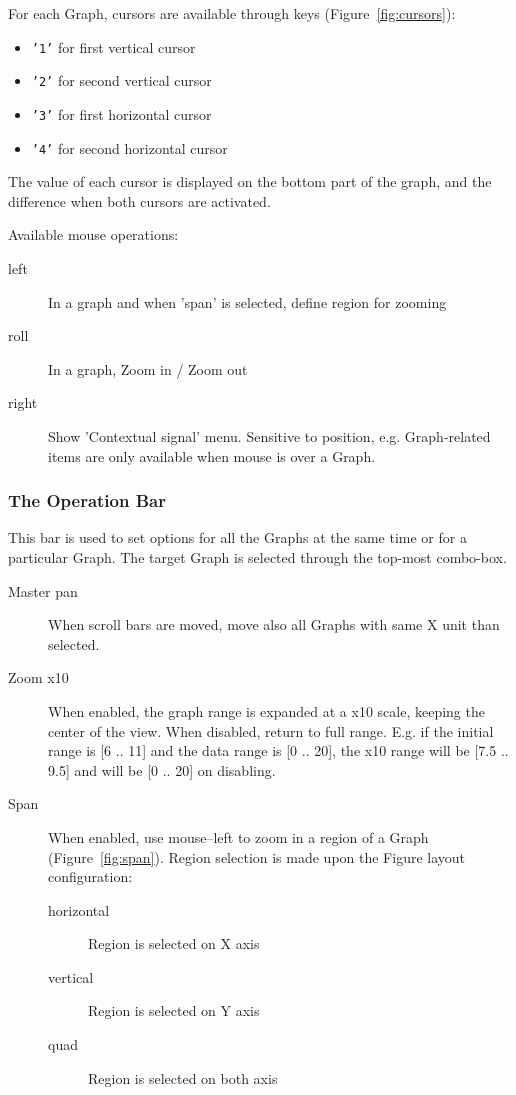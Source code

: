 \documentclass[a4paper,11pt]{article}
\begin{document}
For each Graph, cursors are available through keys (Figure~\ref{fig:cursors}):
\begin{itemize}
\item \texttt{'1'} for first vertical cursor
\item \texttt{'2'} for second vertical cursor
\item \texttt{'3'} for first horizontal cursor
\item \texttt{'4'} for second horizontal cursor
\end{itemize}
The value of each cursor is displayed on the bottom part of the graph, and the difference when both cursors are activated.

\noindent Available mouse operations:
\begin{description}
\item[left] In a graph and when 'span' is selected, define region for zooming
\item[roll] In a graph, Zoom in / Zoom out
\item[right] Show 'Contextual signal' menu. Sensitive to position, e.g. Graph-related items are only available when mouse is over a Graph.
\end{description}


\subsubsection{The Operation Bar}

This bar is used to set options for all the Graphs at the same time or for a particular Graph.
The target Graph is selected through the top-most combo-box.
\begin{description}
\item[Master pan] When scroll bars are moved, move also all Graphs with same X unit than selected.
\item[Zoom x10] When enabled, the graph range is expanded at a x10 scale, keeping the center of the view. When disabled, return to full range. E.g. if the initial range is [6 .. 11] and the data range is [0 .. 20], the x10 range will be [7.5 .. 9.5] and will be [0 .. 20] on disabling.
\item[Span] When enabled, use mouse--left to zoom in a region of a Graph (Figure~\ref{fig:span}). Region selection is made upon the Figure layout configuration:
  \begin{description}
  \item[horizontal] Region is selected on X axis
  \item[vertical] Region is selected on Y axis
  \item[quad] Region is selected on both axis
  \end{description}
\end{description}
\end{document}
